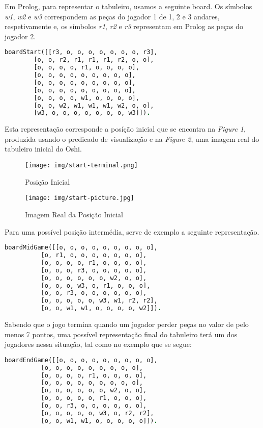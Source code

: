 \documentclass[a4paper]{article}
\begin{document}
Em Prolog, para representar o tabuleiro, usamos a seguinte board. Os símbolos \textit{w1}, \textit{w2} e \textit{w3} correspondem as peças do jogador 1 de 1, 2 e 3 andares, respetivamente e, os símbolos \textit{r1}, \textit{r2} e \textit{r3} representam em Prolog as peças do jogador 2.
\bigskip
\small
\begin{lstlisting}[language=Prolog]
boardStart([[r3, o, o, o, o, o, o, o, r3],
	    [o, o, r2, r1, r1, r1, r2, o, o],
	    [o, o, o, o, r1, o, o, o, o],
	    [o, o, o, o, o, o, o, o, o],
	    [o, o, o, o, o, o, o, o, o],
	    [o, o, o, o, o, o, o, o, o],
	    [o, o, o, o, w1, o, o, o, o],
	    [o, o, w2, w1, w1, w1, w2, o, o],
	    [w3, o, o, o, o, o, o, o, w3]]).
\end{lstlisting}
\normalsize
\bigskip
Esta representação corresponde a posíção inicial que se encontra na \textit{Figure 1}, produzida usando o predicado de visualização e na \textit{Figure 2}, uma imagem real do tabuleiro inicial do Oshi.

\begin{figure}[h!]
\centering
\begin{minipage}{.4\textwidth}
  \centering
  \texttt{[image: img/start-terminal.png]}
  \caption{Posição Inicial}
  \label{fig:start}
\end{minipage}%
\begin{minipage}{.4\textwidth}
  \centering
  \texttt{[image: img/start-picture.jpg]}
  \caption{Imagem Real da Posição Inicial}
  \label{fig:real-pic}
\end{minipage}
\end{figure}
Para uma possível posição intermédia, serve de exemplo a seguinte representação.
\bigskip
\small
\begin{lstlisting}[language=Prolog]
boardMidGame([[o, o, o, o, o, o, o, o, o],
	      [o, r1, o, o, o, o, o, o, o],
	      [o, o, o, o, r1, o, o, o, o],
	      [o, o, o, r3, o, o, o, o, o],
	      [o, o, o, o, o, o, w2, o, o],
	      [o, o, o, w3, o, r1, o, o, o],
	      [o, o, r3, o, o, o, o, o, o],
	      [o, o, o, o, o, w3, w1, r2, r2],
	      [o, o, w1, w1, o, o, o, o, w2]]).
\end{lstlisting}
\normalsize
\bigskip
Sabendo que o jogo termina quando um jogador perder peças no valor de pelo menos 7 pontos, uma possível representação final do tabuleiro terá um dos jogadores nessa situação, tal como no exemplo que se segue:

\bigskip
\small
\begin{lstlisting}[language=Prolog]
boardEndGame([[o, o, o, o, o, o, o, o, o],
	      [o, o, o, o, o, o, o, o, o],
	      [o, o, o, o, r1, o, o, o, o],
	      [o, o, o, o, o, o, o, o, o],
	      [o, o, o, o, o, o, w2, o, o],
	      [o, o, o, o, o, r1, o, o, o],
	      [o, o, r3, o, o, o, o, o, o],
	      [o, o, o, o, o, w3, o, r2, r2],
	      [o, o, w1, w1, o, o, o, o, o]]).
\end{lstlisting}
\normalsize
\bigskip
\end{document}
